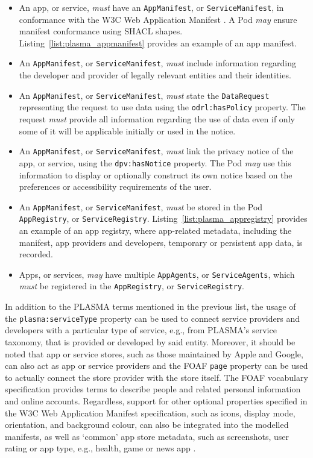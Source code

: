 \begin{itemize}
    \item An app, or service, \textit{must} have an \texttt{AppManifest}, or \texttt{ServiceManifest}, in conformance with the W3C Web Application Manifest \citep{manifest_2023}. A Pod \textit{may} ensure manifest conformance using SHACL shapes. Listing~\ref{list:plasma_appmanifest} provides an example of an app manifest.
    \item An \texttt{AppManifest}, or \texttt{ServiceManifest}, \textit{must} include information regarding the developer and provider of legally relevant entities and their identities.
    \item An \texttt{AppManifest}, or \texttt{ServiceManifest}, \textit{must} state the \texttt{DataRequest} representing the request to use data using the \texttt{odrl:hasPolicy} property. The request \textit{must} provide all information regarding the use of data even if only some of it will be applicable initially or used in the notice.
    \item An \texttt{AppManifest}, or \texttt{ServiceManifest}, \textit{must} link the privacy notice of the app, or service, using the \texttt{dpv:hasNotice} property. The Pod \textit{may} use this information to display or optionally construct its own notice based on the preferences or accessibility requirements of the user.
    \item An \texttt{AppManifest}, or \texttt{ServiceManifest}, \textit{must} be stored in the Pod \texttt{AppRegistry}, or \texttt{ServiceRegistry}. Listing~\ref{list:plasma_appregistry} provides an example of an app registry, where app-related metadata, including the manifest, app providers and developers, temporary or persistent app data, is recorded.
    \item Apps, or services, \textit{may} have multiple \texttt{AppAgents}, or \texttt{ServiceAgents}, which \textit{must} be registered in the \texttt{AppRegistry}, or \texttt{ServiceRegistry}.
\end{itemize}

In addition to the PLASMA terms mentioned in the previous list, the usage of the \texttt{plasma:serviceType} property can be used to connect service providers and developers with a particular type of service, e.g., from PLASMA's service taxonomy, that is provided or developed by said entity.
Moreover, it should be noted that app or service stores, such as those maintained by Apple and Google, can also act as app or service providers and the FOAF \texttt{page} property can be used to actually connect the store provider with the store itself.
The FOAF vocabulary specification \citep{brickley_foaf_2004} provides terms to describe people and related personal information and online accounts.
Regardless, support for other optional properties specified in the W3C Web Application Manifest specification, such as icons, display mode, orientation, and background colour, can also be integrated into the modelled manifests, as well as `common' app store metadata, such as screenshots, user rating or app type, e.g., health, game or news app \citep{gustafson_web_2023}.

